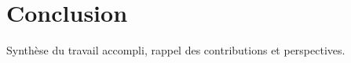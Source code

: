 \chapter{Conclusion}
\label{chap:conclusion}

Synthèse du travail accompli, rappel des contributions et perspectives.